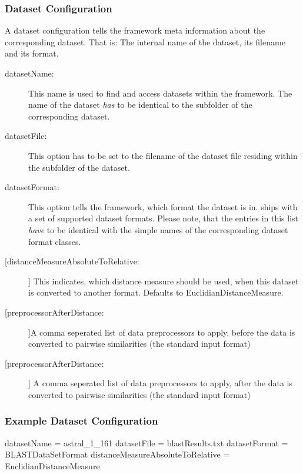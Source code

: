 		
			\subsubsection{Dataset Configuration} \label{subsubsec:datasetconfigs}
			A dataset configuration tells the framework meta information about the corresponding dataset. That is: The internal name of the dataset, its filename and its format.
			
			\begin{description}
			\item[datasetName:] \label{para:datasetName}
			This name is used to find and access datasets within the framework. The name of the dataset \textit{has} to be identical to the subfolder of the corresponding dataset.
			\item[datasetFile:] \label{para:datasetFile}
			This option has to be set to the filename of the dataset file residing within the subfolder of the dataset.
			\item[datasetFormat:] \label{para:datasetFormat}
			This option tells the framework, which format the dataset is in. \clusteval ships with a set of supported dataset formats. Please note, that the entries in this list \textit{have} to be identical with the simple names of the corresponding dataset format classes.
			\item[[distanceMeasureAbsoluteToRelative:]] This indicates, which distance measure should be used, when this dataset is converted to another format. Defaults to EuclidianDistanceMeasure.
			\item[[preprocessorAfterDistance:]]A comma seperated list of data
				 preprocessors to apply, before the data is converted to pairwise
				 similarities (the standard input format)
			\item[[preprocessorAfterDistance:]] A comma seperated list of data
				 preprocessors to apply, after the data is converted to pairwise
				 similarities (the standard input format)
			\end{description}
	
			\subsubsection{Example Dataset Configuration}
			
			\begin{listing}{1}
datasetName = astral_1_161
datasetFile = blastResults.txt
datasetFormat = BLASTDataSetFormat
distanceMeasureAbsoluteToRelative = EuclidianDistanceMeasure \end{listing}

